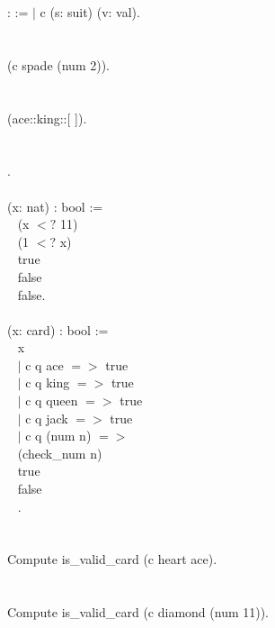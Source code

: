 \begin{code}
\Inductive {} : \Type :=
  $\mid$ c (s: suit) (v: val).
\\ \\
 	\\
\Check (c spade (num 2)).
\\ \\
	\\
\Check (ace::king::[ ]).
\\ \\
 	\\
.
\\ \\
\Definition {} (x: nat) : bool :=	 \\ \-\ \quad
  \If (x $<?$ 11)						 \\ \-\ \quad
  \Then \If (1 $<?$ x)					 \\ \-\ \qquad
       \Then true						 \\ \-\ \qquad
       \Else false						 \\ \-\ \quad
  \Else false.
\\ \\
\Definition {} (x: card) : bool :=	 \\ \-\ \quad
 \match x \with						 \\ \-\ \quad
  $\mid$ c q ace $=>$ true				 \\ \-\ \quad
  $\mid$ c q king $=>$ true			 \\ \-\ \quad
  $\mid$ c q queen $=>$ true			 \\ \-\ \quad
  $\mid$ c q jack $=>$ true			 \\ \-\ \quad
  $\mid$ c q (num n) $=>$ 				 \\ \-\ \qquad\quad
        \If (check\_num n)				 \\ \-\ \qquad\quad
        \Then true			 			 \\ \-\ \qquad\quad
        \Else false						 \\ \-\ \quad
 \End.
\\ \\
	\\
Compute is\_valid\_card (c heart ace).
\\ \\
	\\
Compute is\_valid\_card (c diamond (num 11)).


\end{code}












